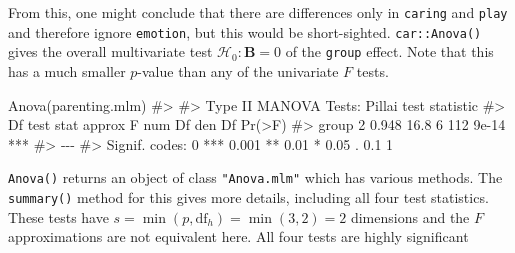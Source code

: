 \documentclass[
  letterpaper,
  10pt,
  krantz2]{krantz}
\makeatletter
\newenvironment{Shaded}{\begin{snugshade}}{\end{snugshade}}
\newcommand{\CommentTok}[1]{\textcolor[rgb]{0.37,0.37,0.37}{#1}}
\newcommand{\FunctionTok}[1]{\textcolor[rgb]{0.28,0.35,0.67}{#1}}
\newcommand{\NormalTok}[1]{\textcolor[rgb]{0.00,0.23,0.31}{#1}}
\newenvironment{kframe}{%
  \medskip{}
  \setlength{\fboxsep}{.8em}
  \def\at@end@of@kframe{}%
  \ifinner\ifhmode%
  \def\at@end@of@kframe{\end{minipage}}%
  \begin{minipage}{\columnwidth}%
  \fi\fi%
  \def\FrameCommand##1{\hskip\@totalleftmargin \hskip-\fboxsep
  \colorbox{shadecolor}{##1}\hskip-\fboxsep
      \hskip-\linewidth \hskip-\@totalleftmargin \hskip\columnwidth}%
  \MakeFramed {\advance\hsize-\width
    \@totalleftmargin\z@ \linewidth\hsize
    \@setminipage}}%
{\par\unskip\endMakeFramed%
  \at@end@of@kframe}
\renewenvironment{Shaded}{\begin{kframe}}{\end{kframe}}
\makeatother
\begin{document}
From this, one might conclude that there are differences only in
\texttt{caring} and \texttt{play} and therefore ignore \texttt{emotion},
but this would be short-sighted. \texttt{car::Anova()} gives the overall
multivariate test \(\mathcal{H}_0: \mathbf{B} = 0\) of the
\texttt{group} effect. Note that this has a much smaller \(p\)-value
than any of the univariate \(F\) tests.

\begin{Shaded}
\begin{Highlighting}[]
\FunctionTok{Anova}\NormalTok{(parenting.mlm)}
\CommentTok{\#\textgreater{} }
\CommentTok{\#\textgreater{} Type II MANOVA Tests: Pillai test statistic}
\CommentTok{\#\textgreater{}       Df test stat approx F num Df den Df Pr(\textgreater{}F)    }
\CommentTok{\#\textgreater{} group  2     0.948     16.8      6    112  9e{-}14 ***}
\CommentTok{\#\textgreater{} {-}{-}{-}}
\CommentTok{\#\textgreater{} Signif. codes:  0 \textquotesingle{}***\textquotesingle{} 0.001 \textquotesingle{}**\textquotesingle{} 0.01 \textquotesingle{}*\textquotesingle{} 0.05 \textquotesingle{}.\textquotesingle{} 0.1 \textquotesingle{} \textquotesingle{} 1}
\end{Highlighting}
\end{Shaded}

\texttt{Anova()} returns an object of class \texttt{"Anova.mlm"} which
has various methods. The \texttt{summary()} method for this gives more
details, including all four test statistics. These tests have
\(s = \min(p, \text{df}_h) = \min(3,2) = 2\) dimensions and the \(F\)
approximations are not equivalent here. All four tests are highly
significant
\end{document}
